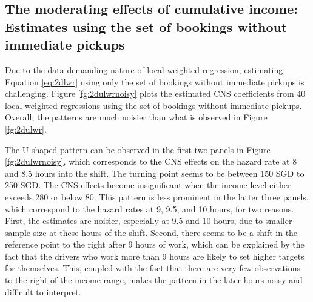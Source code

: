 \documentclass[reviewmode,AEJ]{AEA}
\begin{document}
\begin{appendices}
\begin{table}
\end{table}






\section{The moderating effects of cumulative income: Estimates using the set of bookings without immediate pickups}
\label{apx:CI}
Due to the data demanding nature of local weighted regression, estimating Equation \eqref{eq:2dlwr} using only the set of bookings without immediate pickups is challenging. Figure \ref{fg:2dulwrnoisy} plots the estimated CNS coefficients from 40 local weighted regressions using the set of bookings without immediate pickups. Overall, the patterns are much noisier than what is observed in Figure \ref{fg:2dulwr}. 

The U-shaped pattern can be observed in the first two panels in Figure \ref{fg:2dulwrnoisy}, which corresponds to the CNS effects on the hazard rate at 8 and 8.5 hours into the shift. The turning point seems to be between 150 SGD to 250 SGD. The CNS effects become insignificant when the income level either exceeds 280 or below 80. This pattern is less prominent in the latter three panels, which correspond to the hazard rates at 9, 9.5, and 10 hours, for two reasons. First, the estimates are noisier, especially at 9.5 and 10 hours, due to smaller sample size at these hours of the shift. Second, there seems to be a shift in the reference point  to the right after 9 hours of work, which can be explained by the fact that the drivers who work more than 9 hours are likely to set higher targets for themselves. This, coupled with the fact that there are very few observations to the right of the income range, makes the pattern in the later hours noisy and difficult to interpret. 




\end{appendices}
\end{document}

